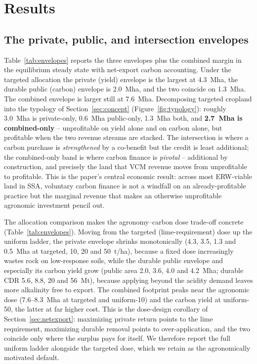 \documentclass[12pt]{article}
\begin{document}
\section{Results}\label{sec:results}

\subsection{The private, public, and intersection envelopes}\label{sec:envelopes}
Table~\ref{tab:envelopes} reports the three envelopes plus the combined margin
in the equilibrium steady state with net-export carbon accounting. Under the
targeted allocation the private (yield) envelope is the largest at 4.3~Mha, the
durable public (carbon) envelope is 2.0~Mha, and the two coincide on 1.3~Mha.
The combined envelope is larger still at 7.6~Mha. Decomposing targeted cropland
into the typology of Section~\ref{sec:concept} (Figure~\ref{fig:typology}):
roughly 3.0~Mha is private-only, 0.6~Mha public-only, 1.3~Mha both, and
\textbf{2.7~Mha is combined-only} -- unprofitable on yield alone and on carbon
alone, but profitable when the two revenue streams are stacked. The intersection
is where a carbon purchase is \emph{strengthened} by a co-benefit but the credit
is least additional; the combined-only band is where carbon finance is
\emph{pivotal} -- additional by construction, and precisely the land that VCM
revenue moves from unprofitable to profitable. This is the paper's central
economic result: across most ERW-viable land in SSA, voluntary carbon finance is
not a windfall on an already-profitable practice but the marginal revenue that
makes an otherwise unprofitable agronomic investment pencil out.

The allocation comparison makes the agronomy--carbon dose trade-off concrete
(Table~\ref{tab:envelopes}). Moving from the targeted (lime-requirement) dose up
the uniform ladder, the private envelope shrinks monotonically (4.3, 3.5, 1.3 and
0.5~Mha at targeted, 10, 20 and 50~t/ha), because a fixed dose increasingly
wastes rock on low-response soils, while the durable public envelope and
especially its carbon yield grow (public area 2.0, 3.6, 4.0 and 4.2~Mha; durable
CDR 5.6, 8.8, 20 and 56~Mt), because applying beyond the acidity demand leaves
more alkalinity free to export. The combined footprint peaks near the agronomic
dose (7.6--8.3~Mha at targeted and uniform-10) and the carbon yield at
uniform-50, the latter at far higher cost. This is the dose-design corollary of
Section~\ref{sec:netexport}: maximizing private return points to the lime
requirement, maximizing durable removal points to over-application, and the two
coincide only where the surplus pays for itself. We therefore report the full
uniform ladder alongside the targeted dose, which we retain as the agronomically
motivated default.
\end{document}

